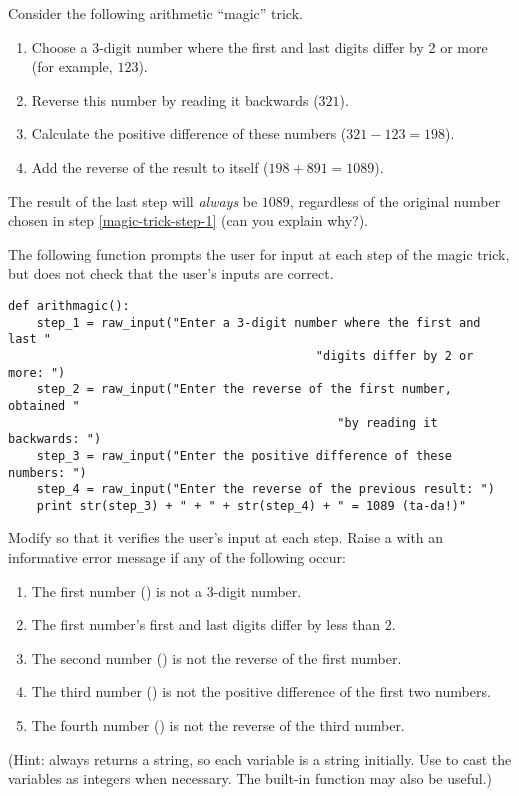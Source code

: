 \begin{problem} %
Consider the following arithmetic ``magic'' trick.
\begin{enumerate}
    \item Choose a 3-digit number where the first and last digits differ by 2 or more (for example, $123$).
    \label{magic-trick-step-1}
    \item Reverse this number by reading it backwards ($321$).
    \item Calculate the positive difference of these numbers ($321 - 123 = 198$).
    \item Add the reverse of the result to itself ($198 + 891 = 1089$).
\end{enumerate}
The result of the last step will \emph{always} be $1089$, regardless of the original number chosen in step \ref{magic-trick-step-1} (can you explain why?).

The following function prompts the user for input at each step of the magic trick, but does not check that the user's inputs are correct.
\newpage
\begin{lstlisting}
def arithmagic():
    step_1 = raw_input("Enter a 3-digit number where the first and last "
                                           "digits differ by 2 or more: ")
    step_2 = raw_input("Enter the reverse of the first number, obtained "
                                              "by reading it backwards: ")
    step_3 = raw_input("Enter the positive difference of these numbers: ")
    step_4 = raw_input("Enter the reverse of the previous result: ")
    print str(step_3) + " + " + str(step_4) + " = 1089 (ta-da!)"
\end{lstlisting}

Modify  so that it verifies the user's input at each step.
Raise a  with an informative error message if any of the following occur:
\begin{enumerate}
\item The first number () is not a 3-digit number.
\item The first number's first and last digits differ by less than $2$.
\item The second number () is not the reverse of the first number.
\item The third number () is not the positive difference of the first two numbers.
\item The fourth number () is not the reverse of the third number.
\end{enumerate}
%
(Hint:  always returns a string, so each variable is a string initially. Use  to cast the variables as integers when necessary. The built-in function  may also be useful.)

\end{problem}

